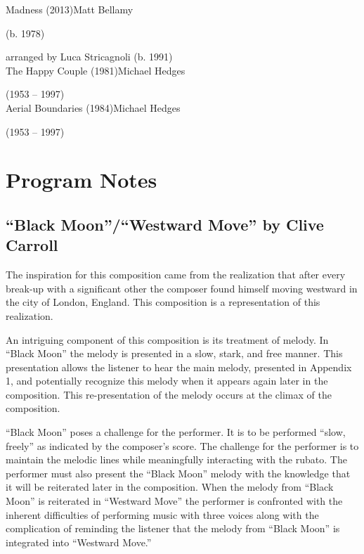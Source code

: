 \documentclass{tufte-handout}
\begin{document}
\begin{fullwidth}
\noindent Madness (2013)\dotfill Matt Bellamy\\
\strut\hfill (b. 1978)\\
\strut\hfill arranged by Luca Stricagnoli (b. 1991)\\

\noindent The Happy Couple (1981)\dotfill Michael Hedges\\
\strut\hfill (1953 -- 1997)\\

\noindent Aerial Boundaries (1984)\dotfill Michael Hedges\\
\strut\hfill (1953 -- 1997)\\
\end{fullwidth}

\clearpage

\section*{Program Notes}
\label{sec:program-notes}

\subsection*{``Black Moon''/``Westward Move'' by Clive Carroll}
\label{sec:black-moonw-move}
The inspiration for this composition came from the realization that after every break-up with a significant other the composer found himself moving westward in the city of London, England. This composition is a representation of this realization.

An intriguing component of this composition is its treatment of melody. In ``Black Moon'' the melody is presented in a slow, stark, and free manner. This presentation allows the listener to hear the main melody, presented in Appendix 1, and potentially recognize this melody when it appears again later in the composition. This re-presentation of the melody occurs at the climax of the composition. 

``Black Moon'' poses a challenge for the performer. It is to be performed ``slow, freely'' as indicated by the composer's score. The challenge for the performer is to maintain the melodic lines while meaningfully interacting with the rubato. The performer must also present the ``Black Moon'' melody with the knowledge that it will be reiterated later in the composition. When the melody from ``Black Moon'' is reiterated in ``Westward Move'' the performer is confronted with the inherent difficulties of performing music with three voices along with the complication of reminding the listener that the melody from ``Black Moon'' is integrated into ``Westward Move.''
\end{document}
